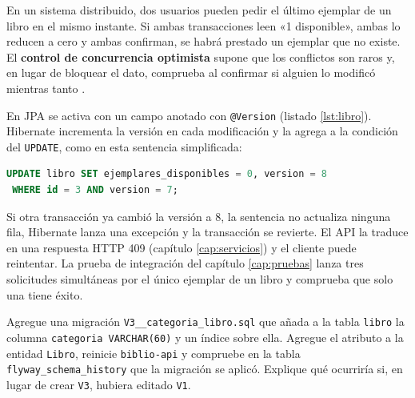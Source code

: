 En un sistema distribuido, dos usuarios pueden pedir el último ejemplar de un libro en el mismo instante. Si ambas transacciones leen «1 disponible», ambas lo reducen a cero y ambas confirman, se habrá prestado un ejemplar que no existe. El \textbf{control de concurrencia optimista} supone que los conflictos son raros y, en lugar de bloquear el dato, comprueba al confirmar si alguien lo modificó mientras tanto \cite{kung1981optimistic}.

En JPA se activa con un campo anotado con \texttt{@Version} (listado \ref{lst:libro}). Hibernate incrementa la versión en cada modificación y la agrega a la condición del \texttt{UPDATE}, como en esta sentencia simplificada:

\begin{lstlisting}[language=SQL,numbers=none]
UPDATE libro SET ejemplares_disponibles = 0, version = 8
 WHERE id = 3 AND version = 7;
\end{lstlisting}

Si otra transacción ya cambió la versión a 8, la sentencia no actualiza ninguna fila, Hibernate lanza una excepción y la transacción se revierte. El API la traduce en una respuesta HTTP 409 (capítulo \ref{cap:servicios}) y el cliente puede reintentar. La prueba de integración del capítulo \ref{cap:pruebas} lanza tres solicitudes simultáneas por el único ejemplar de un libro y comprueba que solo una tiene éxito.

\begin{practicaBox}[title={Práctica 4.1: una migración nueva}]
	Agregue una migración \texttt{V3\_\_categoria\_libro.sql} que añada a la tabla \texttt{libro} la columna \texttt{categoria VARCHAR(60)} y un índice sobre ella. Agregue el atributo a la entidad \texttt{Libro}, reinicie \texttt{biblio-api} y compruebe en la tabla \texttt{flyway\_schema\_history} que la migración se aplicó. Explique qué ocurriría si, en lugar de crear \texttt{V3}, hubiera editado \texttt{V1}.
\end{practicaBox}
